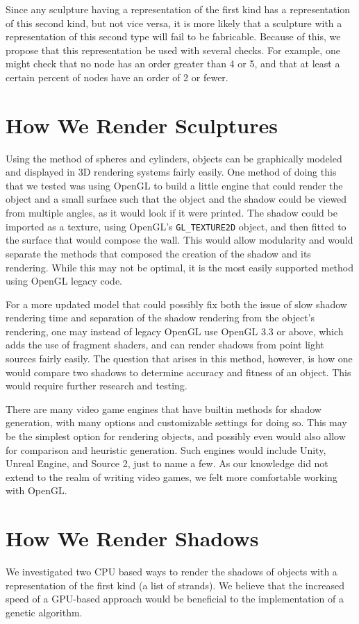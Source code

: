\documentclass[10pt]{article}
\begin{document}
Since any sculpture having a representation of the first kind has a representation of this second kind, but not vice versa, it is more likely that a sculpture with a representation of this second type will fail to be fabricable. Because of this, we propose that this representation be used with several checks. For example, one might check that no node has an order greater than 4 or 5, and that at least a certain percent of nodes have an order of 2 or fewer.

\section{How We Render Sculptures}
Using the method of spheres and cylinders, objects can be graphically modeled and displayed in 3D rendering systems fairly easily.  One method of doing this that we tested was using OpenGL to build a little engine that could render the object and a small surface such that the object and the shadow could be viewed from multiple angles, as it would look if it were printed.  The shadow could be imported as a texture, using OpenGL's \texttt{GL\_TEXTURE2D} object, and then fitted to the surface that would compose the wall.  This would allow modularity and would separate the methods that composed the creation of the shadow and its rendering.  While this may not be optimal, it is the most easily supported method using OpenGL legacy code.

For a more updated model that could possibly fix both the issue of slow shadow rendering time and separation of the shadow rendering from the object's rendering, one may instead of legacy OpenGL use OpenGL 3.3 or above, which adds the use of fragment shaders, and can render shadows from point light sources fairly easily.  The question that arises in this method, however, is how one would compare two shadows to determine accuracy and fitness of an object.  This would require further research and testing.

There are many video game engines that have builtin methods for shadow generation, with many options and customizable settings for doing so.  This may be the simplest option for rendering objects, and possibly even would also allow for comparison and heuristic generation.  Such engines would include Unity, Unreal Engine, and Source 2, just to name a few.  As our knowledge did not extend to the realm of writing video games, we felt more comfortable working with OpenGL.

\section{How We Render Shadows}
We investigated two CPU based ways to render the shadows of objects with a representation of the first kind (a list of strands). We believe that the increased speed of a GPU-based approach would be beneficial to the implementation of a genetic algorithm.
\end{document}
